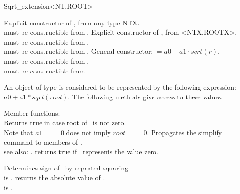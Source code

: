 \begin{ccRefClass}{Sqrt_extension<NT,ROOT>}
\begin{ccAdvanced}
        {Explicit constructor of , from any type NTX.\\
          must be constructible from .}
        {Explicit constructor of , from <NTX,ROOTX>.\\
            must be constructible from .\\
            must be constructible from .}
        {General constructor: \ccVar $= a0 + a1 \cdot sqrt(r)$.\\
          must be constructible from .\\
          must be constructible from .}
\end{ccAdvanced}

\ccOperations

An object of type  is considered to be 
represented by the following expression: $a0 + a1 * sqrt(root)$. 
The following methods give access to these values:

 \ccGlue
{}\ccGlue
{}\ccGlue

Member functions:\\
 	{Returns true in case root of \ccVar\ is not zero.  \\
         Note that $a1 == 0 $ does not imply $root == 0$. }   
        { Propagates the simplify command to members of \ccVar. \\
          see also: .}
        {returns true if \ccVar\ represents the value zero.}

        {Determines sign of \ccVar\ by repeated squaring.
        \ccPrecond\\  is .}
 	{returns the absolute value of \ccVar. 
        \ccPrecond\\  is .}


\end{ccRefClass}
